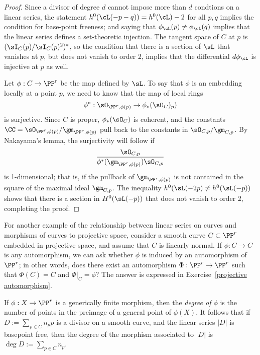 \begin{proof}
Since a divisor of degree $d$ cannot impose more than $d$ condtions on a linear series, the statement $h^0(\cL(-p-q)) = h^0(\cL) - 2$ for all $p, q$ implies the condition for base-point freeness; and saying that $\phi_\cL(p) \neq \phi_\cL(q)$ implies that the linear series defines a set-theoretic injection. The tangent space of $C$ at $p$ is $(\sI_C(p)/\sI_C(p)^2)^*$, so the condition that there is a section of $\sL$ that vanishes at $p$, but does not vanish
to order 2, implies that the differential $d\phi_\cL$ is injective at $p$ as well.

Let $\phi:C \to \PP^r$ be the map defined by $\sL$. To say that $\phi$  is an embedding locally at a point $p$, we need to know that the map of local rings
$$
\phi^*: \sO_{\PP^r,\phi(p)} \to \phi_*(\sO_{C})_p)
$$
is surjective. Since $C$ is proper,  $\phi_*(\sO_{C})$ is coherent, 
and the constants  $\CC =\sO_{\PP^r,\phi(p)}/\gm_{\PP^r,\phi(p)}$ pull back to the constants in
$\sO_{C,p}/\gm_{C,p}$. 
By Nakayama's lemma, the surjectivity will follow if 
$$
\frac{\sO_{C,p}}
{\phi^*(\gm_{\PP^r,\phi(p)})  \sO_{C,p}}
$$
is 1-dimensional; that is, if  the pullback of $\gm_{\PP^r,\phi(p)}$ is not contained in the square of the
maximal ideal $\gm_{C,p}$. The inequality $h^0(\sL(-2p) \neq h^0(\sL(-p))$ shows that there is a 
section in $H^0(\sL(-p))$ that does not vanish to order 2, completing the proof.
\end{proof}


For another example of the relationship between linear series on curves and morphisms of curves to projective space, consider a smooth curve $C \subset \PP^r$ embedded in projective space, and assume that $C$ is linearly normal. If $\phi : C \to C$ is any automorphism, we can ask whether $\phi$ is induced by an automorphism of $\PP^r$; in other words, does there exist an automorphism $\Phi : \PP^r \to \PP^r$ such that $\Phi(C) = C$ and $\Phi|_C = \phi$? The answer is expressed in Exercise~\ref{projective automorphism}.


If $\phi:X \to \PP^r$ is a generically finite morphism, then the \emph{degree of $\phi$} is the number of points in the preimage of a general point of $\phi(X)$. It follows that if $D := \sum_{p\in C} n_pp$ is a divisor on a smooth curve, and the linear series $|D|$ is basepoint free, then the degree of the morphism associated to $|D|$ is $\deg D := \sum_{p\in C} n_p$.

